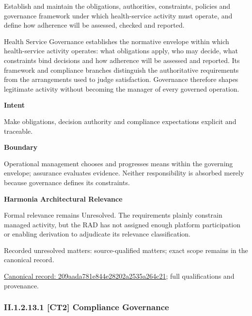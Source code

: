 Establish and maintain the obligations, authorities, constraints, policies and governance framework under which health-service activity must operate, and define how adherence will be assessed, checked and reported.



Health Service Governance establishes the normative envelope within which health-service activity operates: what obligations apply, who may decide, what constraints bind decisions and how adherence will be assessed and reported. Its framework and compliance branches distinguish the authoritative requirements from the arrangements used to judge satisfaction. Governance therefore shapes legitimate activity without becoming the manager of every governed operation.



\textbf{Intent}



Make obligations, decision authority and compliance expectations explicit and traceable.



\textbf{Boundary}



Operational management chooses and progresses means within the governing envelope; assurance evaluates evidence. Neither responsibility is absorbed merely because governance defines its constraints.



\textbf{Harmonia Architectural Relevance}



Formal relevance remains Unresolved. The requirements plainly constrain managed activity, but the RAD has not assigned enough platform participation or enabling derivation to adjudicate its relevance classification.


{\small Recorded unresolved matters: source-qualified matters; exact scope remains in the canonical record.}\par
{\footnotesize \href{../../../../continuum/strategy/capability/209aada781e844e28202a2535a264c21.md}{Canonical record: 209aada781e844e28202a2535a264c21}; full qualifications and provenance.}\par
\subsubsection*{II.1.2.13.1 [CT2] Compliance Governance}
\label{navigation:II.1.2.13.1}

